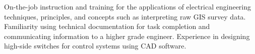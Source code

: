 \jobskills
On-the-job instruction and training for the applications of electrical engineering techniques, principles, %
and concepts such as interpreting raw GIS survey data. Familiarity using technical documentation for task %
completion and communicating information to a higher grade engineer. Experience in designing high-side %
switches for control systems using CAD software.